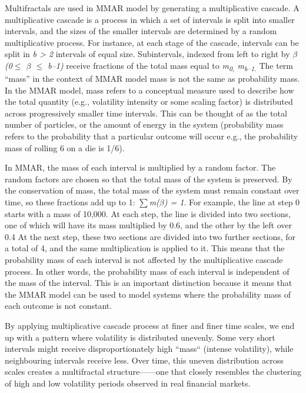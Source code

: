 \documentclass[12pt,a4paper]{report}
\numberwithin{equation}{section}
\begin{document}
Multifractals are used in MMAR model by generating a multiplicative
cascade. A multiplicative cascade is a process in which a set of
intervals is split into smaller intervals, and the sizes of the smaller
intervals are determined by a random multiplicative process. For
instance, at each stage of the cascade, intervals can be split in
\emph{b \textgreater{} 2} intervals of equal size. Subintervals, indexed
from left to right by \emph{$\beta$ (0$\leq$ $\beta$ $\leq$ b--1)} receive fractions of the
total mass equal to \emph{m\textsubscript{0,} m\textsubscript{b--1.}} The
term ``mass'' in the context of MMAR model mass is not the same as
probability mass. In the MMAR model, mass refers to a conceptual measure
used to describe how the total quantity (e.g., volatility intensity or
some scaling factor) is distributed across progressively smaller time
intervals. This can be thought of as the total number of particles, or
the amount of energy in the system (probability mass refers to the
probability that a particular outcome will occur e.g., the probability
mass of rolling 6 on a die is 1/6).

In MMAR, the mass of each interval is multiplied by a random factor. The
random factors are chosen so that the total mass of the system is
preserved. By the conservation of mass, the total mass of the system
must remain constant over time, so these fractions add up to 1:
\emph{$\sum$m($\beta$) = 1}. For example, the line at step 0 starts with a mass of
10,000. At each step, the line is divided into two sections, one of
which will have its mass multiplied by 0.6, and the other by the left
over 0.4 At the next step, these two sections are divided into two
further sections, for a total of 4, and the same multiplication is
applied to it. This means that the probability mass of each interval is
not affected by the multiplicative cascade process. In other words, the
probability mass of each interval is independent of the mass of the
interval. This is an important distinction because it means that the
MMAR model can be used to model systems where the probability mass of
each outcome is not constant.

By applying multiplicative cascade process at finer and finer time
scales, we end up with a pattern where volatility is distributed
unevenly. Some very short intervals might receive disproportionately
high ``mass`` (intense volatility), while neighbouring intervals receive
less. Over time, this uneven distribution across scales creates a
multifractal structure------one that closely resembles the clustering of
high and low volatility periods observed in real financial markets.
\end{document}
